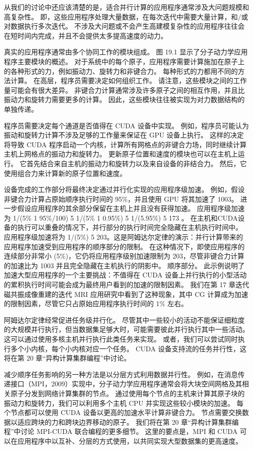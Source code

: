 从我们的讨论中还应该清楚的是，适合并行计算的应用程序通常涉及大问题规模和高复杂性。 即，这些应用程序处理大量数据，在每次迭代中需要大量计算，和/或对数据执行多次迭代。 不涉及大问题或不会产生高建模复杂性的应用程序往往会在短时间内完成，并且不会提供太多提高速度的动力。

真实的应用程序通常由多个协同工作的模块组成。 图 19.1 显示了分子动力学应用程序主要模块的概述。 对于系统中的每个原子，应用程序需要计算施加在原子上的各种形式的力，例如振动力、旋转力和非键合力。 每种形式的力都用不同的方法计算。 在高层，程序员需要决定如何组织工作。 请注意，这些模块之间的工作量可能会有很大差异。 非键合力计算通常涉及许多原子之间的相互作用，并且比振动力和旋转力需要更多的计算。 因此，这些模块往往被实现为对力数据结构的单独传递。

程序员需要决定每个通道是否值得在 CUDA 设备中实现。 例如，程序员可能认为振动和旋转力计算不涉及足够的工作量来保证在 GPU 设备上执行。 这样的决定将导致 CUDA 程序启动一个内核，计算所有网格点的非键合力场，同时继续计算主机上网格点的振动力和旋转力。 更新原子位置和速度的模块也可以在主机上运行。 它首先结合来自主机的振动力和旋转力以及来自设备的非结合力。 然后，它使用组合力来计算新的原子位置和速度。

设备完成的工作部分将最终决定通过并行化实现的应用程序级加速。 例如，假设非键合力计算占原始顺序执行时间的 95\%，并且使用 GPU 将其加速了 1003。 进一步假设应用程序的其余部分保留在主机上并且没有获得加速。 应用程序级加速为 1/(5\% 1 95\%/100) 5 1/(5\% 1 0.95\%) 5 1/(5.95\%) 5 173 。 在主机和CUDA设备的执行可以重叠的情况下，并行部分的执行时间完全隐藏在主机执行时间中。 应用程序级加速将为 1/(5\%) 5 203。这是阿姆达尔定律的演示：并行计算带来的应用程序加速受到应用程序的顺序部分的限制。 在这种情况下，即使应用程序的连续部分非常小 (5\%)，它仍将应用程序级别加速限制为 203，尽管非键合力计算的加速比为 1003 并且完全隐藏在主机执行的阴影中。 顺序部分。 此示例说明了加速大型应用程序的一个主要挑战：不值得在 CUDA 设备上并行执行的小型活动的累积执行时间可能会成为最终用户看到的加速的限制因素。 我们在第 17 章迭代磁共振成像重建的迭代 MRI 应用研究中看到了这种现象，其中 CG 计算成为加速的限制因素，尽管它只占原始应用程序执行时间的 1\% 左右。

阿姆达尔定律经常促进任务级并行化。 尽管其中一些较小的活动不能保证细粒度的大规模并行执行，但当数据集足够大时，可能需要彼此并行执行其中一些活动。 这可以通过使用多核主机并行执行此类任务来实现。 或者，我们可以尝试同时执行多个小内核，每个小内核对应一个任务。 CUDA 设备支持流的任务并行性，这将在第 20 章“异构计算集群编程”中讨论。

减少顺序任务影响的另一种方法是以分层方式利用数据并行性。 例如，在消息传递接口（MPI，2009）实现中，分子动力学应用程序通常会将大块空间网格及其相关原子分发到网络计算集群的节点。 通过使用每个节点的主机来计算其原子块的振动力和旋转力，我们可以利用多个主机 CPU 并实现这些较小模块的加速。 每个节点都可以使用 CUDA 设备以更高的加速水平计算非键合力。 节点需要交换数据以适应跨块的力和跨块边界移动的原子。 我们将在第 20 章“异构计算集群编程”中讨论 MPI-CUDA 联合编程的更多细节。 这里的要点是，MPI 和 CUDA 可以在应用程序中以互补、分层的方式使用，以共同实现大型数据集的更高速度。

